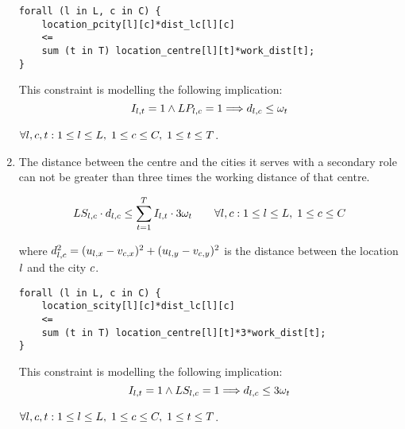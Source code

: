 \begin{enumerate}
\begin{lstlisting}
forall (l in L, c in C) {
	location_pcity[l][c]*dist_lc[l][c]
	<=
	sum (t in T) location_centre[l][t]*work_dist[t];
}
\end{lstlisting}
	
	\hfill
    
    This constraint is modelling the following implication:
    \[
    I_{l, t} = 1 \wedge LP_{l, c} = 1
    \Longrightarrow d_{l, c} \le \omega_t
    \]
	
	$\forall l, c, t: 1 \le l \le L,\; 1 \le c \le C,\;
	1 \le t \le T$.
	
	\item The distance between the centre and the cities it serves with a secondary role can not be
	greater than three times the working distance of that centre.
		
\begin{equation}
    LS_{l, c} \cdot d_{l, c} \le
    \sum_{t = 1}^{T} I_{l, t} \cdot 3\omega_{t}
    \qquad
    \forall l, c:
    1 \le l \le L,\;
    1 \le c \le C
    \label{cstr:working-distance-secondary}
    \end{equation}
    
    where $d_{l, c}^2 =
    (u_{l, x} - v_{c, x})^2 + (u_{l, y} - v_{c, y})^2$ is the distance between
    the location $l$ and the city $c$.
    
\begin{lstlisting}
forall (l in L, c in C) {
	location_scity[l][c]*dist_lc[l][c]
	<=
	sum (t in T) location_centre[l][t]*3*work_dist[t];
}
\end{lstlisting}
	
	\hfill
    
    This constraint is modelling the following implication:
    \[
    I_{l, t} = 1 \wedge LS_{l, c} = 1
    \Longrightarrow d_{l, c} \le 3\omega_t
    \]
	
	$\forall l, c, t: 1 \le l \le L,\; 1 \le c \le C,\;
	1 \le t \le T$.
	    
\end{enumerate}



